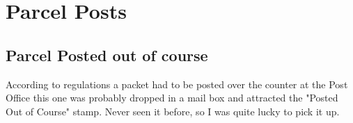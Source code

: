 \chapter{Parcel Posts}
	 
\section{Parcel Posted out of course}




According to regulations a packet had to be posted over the 
counter at the Post Office this one was probably dropped 
in a mail box and attracted the "Posted Out of Course" stamp. 
Never seen it before, so I was quite lucky to pick it up.

 

 

 

 

 

 

                       